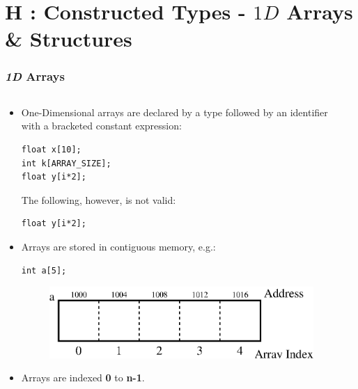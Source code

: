 \section{H : Constructed Types - $1D$ Arrays \& Structures }
\label{chap:contypes}

\begin{frame}[fragile]
\frametitle{{\em 1D} Arrays}

\begin{columns}

\begin{column}{0.55\textwidth}
\begin{itemize}
\item One-Dimensional arrays are declared by a type
followed by an identifier with a bracketed constant expression:
{\small
\begin{verbatim}
float x[10];
int k[ARRAY_SIZE];
float y[i*2];
\end{verbatim}
}
The following, however, is not valid:
{\small
\begin{verbatim}
float y[i*2];
\end{verbatim}
}
\item Arrays are stored in contiguous memory, e.g.:
{\small
\begin{verbatim}
int a[5];
\end{verbatim}
}
\begin{center}
\begin{figure}[h]
\centerline{
\includegraphics[scale=0.40]{../Figs/array9_1.eps}
}
\end{figure}
\end{center}
\item Arrays are indexed {\bf 0} to {\bf n-1}.
\end{itemize}

\end{column}

\pause
\begin{column}{0.35\textwidth}

\end{column}

\end{columns}
\end{frame}

